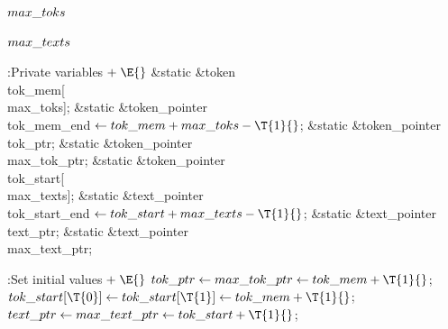 \Y\B\4\D$\\{max\_toks}$ \5
\par
\B\4\D$\\{max\_texts}$ \5
\par
\Y\B\4:Private variables\X${}\mathrel+\E{}$\6
\&{static} \&{token} \\{tok\_mem}[\\{max\_toks}];\6
\&{static} \&{token\_pointer} \\{tok\_mem\_end}${}\K\\{tok\_mem}+\\{max\_toks}-%
\T{1}{}$;\6
\&{static} \&{token\_pointer} \\{tok\_ptr};\6
\&{static} \&{token\_pointer} \\{max\_tok\_ptr};\6
\&{static} \&{token\_pointer} \\{tok\_start}[\\{max\_texts}];\6
\&{static} \&{text\_pointer} \\{tok\_start\_end}${}\K\\{tok\_start}+\\{max%
\_texts}-\T{1}{}$;\6
\&{static} \&{text\_pointer} \\{text\_ptr};\6
\&{static} \&{text\_pointer} \\{max\_text\_ptr};\par
\fi

\B{}:Set initial values\X${}\mathrel+\E{}$\6
$\\{tok\_ptr}\K\\{max\_tok\_ptr}\K\\{tok\_mem}+\T{1}{}$;\6
${}\\{tok\_start}[\T{0}]\K\\{tok\_start}[\T{1}]\K\\{tok\_mem}+\T{1}{}$;\6
${}\\{text\_ptr}\K\\{max\_text\_ptr}\K\\{tok\_start}+\T{1}{}$;\par
\fi

